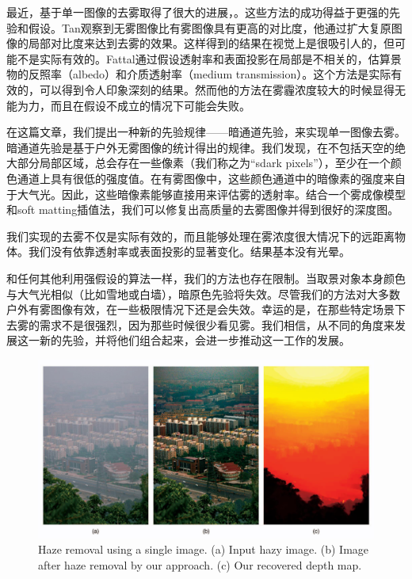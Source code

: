 \documentclass{ctexart}
\begin{document}
最近，基于单一图像的去雾取得了很大的进展\cite{Fattal2008}，\cite{Tan2008}。这些方法的成功得益于更强的先验和假设。Tan\cite{Tan2008}观察到无雾图像比有雾图像具有更高的对比度，他通过扩大复原图像的局部对比度来达到去雾的效果。这样得到的结果在视觉上是很吸引人的，但可能不是实际有效的。Fattal\cite{Fattal2008}通过假设透射率和表面投影在局部是不相关的，估算景物的反照率（albedo）和介质透射率（medium transmission）。这个方法是实际有效的，可以得到令人印象深刻的结果。然而他的方法在雾霾浓度较大的时候显得无能为力，而且在假设不成立的情况下可能会失败。\par

在这篇文章，我们提出一种新的先验规律——暗通道先验，来实现单一图像去雾。暗通道先验是基于户外无雾图像的统计得出的规律。我们发现，在不包括天空的绝大部分局部区域，总会存在一些像素（我们称之为“sdark pixels”），至少在一个颜色通道上具有很低的强度值。在有雾图像中，这些颜色通道中的暗像素的强度来自于大气光。因此，这些暗像素能够直接用来评估雾的透射率。结合一个雾成像模型和soft matting插值法，我们可以修复出高质量的去雾图像并得到很好的深度图。\par

我们实现的去雾不仅是实际有效的，而且能够处理在雾浓度很大情况下的远距离物体。我们没有依靠透射率或表面投影的显著变化。结果基本没有光晕。\par

和任何其他利用强假设的算法一样，我们的方法也存在限制。当取景对象本身颜色与大气光相似（比如雪地或白墙），暗原色先验将失效。尽管我们的方法对大多数户外有雾图像有效，在一些极限情况下还是会失效。幸运的是，在那些特定场景下去雾的需求不是很强烈，因为那些时候很少看见雾。我们相信，从不同的角度来发展这一新的先验，并将他们组合起来，会进一步推动这一工作的发展。\par

\begin{figure}[tbp]
	\centering
	\includegraphics[width=\textwidth]{img/02.jpg}
	\caption{Haze removal using a single image. (a) Input hazy image. (b) Image after haze removal by our approach. (c) Our recovered depth map.}\label{fig:01}
\end{figure}
\end{document}

